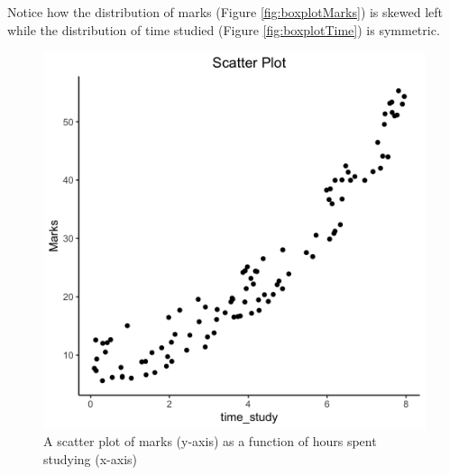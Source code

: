 \documentclass{article}
\begin{document}
\noindent Notice how the distribution of marks (Figure \ref{fig:boxplotMarks}) is skewed left while the distribution of time studied (Figure \ref{fig:boxplotTime}) is symmetric.
\clearpage

\begin{figure}[h]
\centering
    \includegraphics[width=0.4\linewidth]{imgs/Scatter_Plot.png}
    \caption{A scatter plot of marks (y-axis) as a function of hours spent studying (x-axis) }
    \label{fig:scatterplot}
\end{figure}
\end{document}

